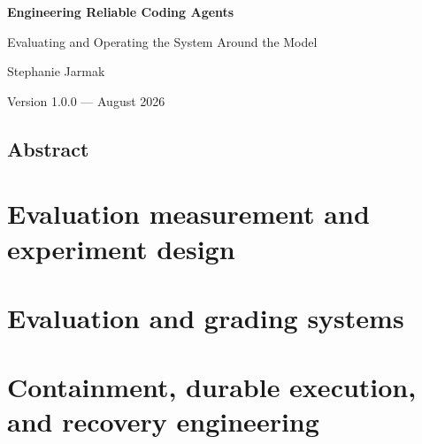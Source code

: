 \documentclass[11pt,oneside]{book}
\newcommand{\currentparttitle}{}
\begin{document}
\frontmatter

\begin{titlepage}
  \centering
  \vspace*{0.16\textheight}
  {\Huge\bfseries Engineering Reliable Coding Agents\par}
  \vspace{1.2em}
  {\Large Evaluating and Operating the System Around the Model\par}
  \vspace{2.5em}
  {\large Stephanie Jarmak\par}
  \vfill
  {\large Version 1.0.0 --- August 2026\par}
\end{titlepage}

\chapter*{Abstract}


\tableofcontents
\listoffigures
\listoftables


\mainmatter
\part{Evaluation measurement and experiment design}
\gdef\currentparttitle{Part I: Evaluation}







\part{Evaluation and grading systems}
\gdef\currentparttitle{Part II: Grading}







\part{Containment, durable execution, and recovery engineering}
\gdef\currentparttitle{Part III: Containment and recovery}
\end{document}
